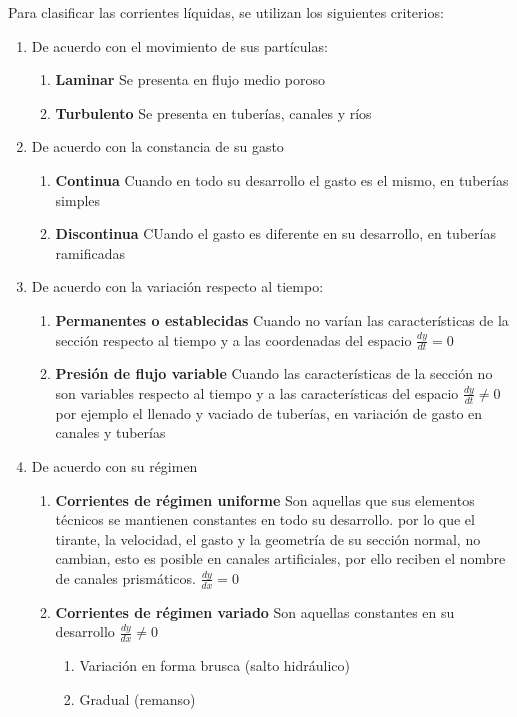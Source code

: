 Para clasificar las corrientes líquidas, se utilizan los siguientes criterios: 
\begin{enumerate}
    \item De acuerdo con el movimiento de sus partículas: \begin{enumerate}
        \item \textbf{Laminar} Se presenta en flujo medio poroso
        \item \textbf{Turbulento} Se presenta en tuberías, canales y ríos
    \end{enumerate}
    \item De acuerdo con la constancia de su gasto \begin{enumerate}
        \item \textbf{Continua} Cuando en todo su desarrollo el gasto es el mismo, en tuberías simples
        \item \textbf{Discontinua} CUando el gasto es diferente en su desarrollo, en tuberías ramificadas
    \end{enumerate}
    \item De acuerdo con la variación respecto al tiempo: \begin{enumerate}
        \item \textbf{Permanentes o establecidas} Cuando no varían las características de la sección respecto al tiempo y a las coordenadas del espacio $\frac{dy}{dt}=0$
        \item \textbf{Presión de flujo variable} Cuando las características de la sección no son variables respecto al tiempo y a las características del espacio $\frac{dy}{dt}\neq 0$ por ejemplo el llenado y vaciado de tuberías, en variación de gasto en canales y tuberías
        \end{enumerate}
    \item De acuerdo con su régimen \begin{enumerate}
        \item \textbf{Corrientes de régimen uniforme} Son aquellas que sus elementos técnicos se mantienen constantes en todo su desarrollo. por lo que el tirante, la velocidad, el gasto y la geometría de su sección normal, no cambian, esto es posible en canales artificiales, por ello reciben el nombre de canales prismáticos. $\frac{dy}{dx}=0$
        \item \textbf{Corrientes de régimen variado} Son aquellas constantes en su desarrollo $\frac{dy}{dx}\neq 0$\begin{enumerate}
            \item Variación en forma brusca (salto hidráulico)
            \item Gradual (remanso)
        \end{enumerate}
    \end{enumerate}
\end{enumerate}


